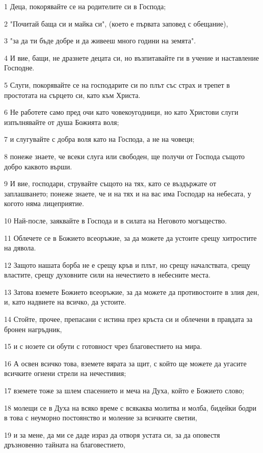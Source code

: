 \par 1 Деца, покорявайте се на родителите си в Господа;
\par 2 "Почитай баща си и майка си", (което е първата заповед с обещание),
\par 3 "за да ти бъде добре и да живееш много години на земята".
\par 4 И вие, бащи, не дразнете децата си, но възпитавайте ги в учение и наставление Господне.
\par 5 Слуги, покорявайте се на господарите си по плът със страх и трепет в простотата на сърцето си, като към Христа.
\par 6 Не работете само пред очи като човекоугодници, но като Христови слуги изпълнявайте от душа Божията воля;
\par 7 и слугувайте с добра воля като на Господа, а не на човеци;
\par 8 понеже знаете, че всеки слуга или свободен, ще получи от Господа същото добро каквото върши.
\par 9 И вие, господари, струвайте същото на тях, като се въздържате от заплашването; понеже знаете, че и на тях и на вас има Господар на небесата, у когото няма лицеприятие.
\par 10 Най-после, заяквайте в Господа и в силата на Неговото могъщество.
\par 11 Облечете се в Божието всеоръжие, за да можете да устоите срещу хитростите на дявола.
\par 12 Защото нашата борба не е срещу кръв и плът, но срещу началствата, срещу властите, срещу духовните сили на нечестието в небесните места.
\par 13 Затова вземете Божието всеоръжие, за да можете да противостоите в злия ден, и, като надвиете на всичко, да устоите.
\par 14 Стойте, прочее, препасани с истина през кръста си и облечени в правдата за бронен нагръдник,
\par 15 и с нозете си обути с готовност чрез благовестието на мира.
\par 16 А освен всичко това, вземете вярата за щит, с който ще можете да угасите всичките огнени стрели на нечестивия;
\par 17 вземете тоже за шлем спасението и меча на Духа, който е Божието слово;
\par 18 молещи се в Духа на всяко време с всякаква молитва и молба, бидейки бодри в това с неуморно постоянство и моление за всичките светии,
\par 19 и за мене, да ми се даде израз да отворя устата си, за да оповестя дръзновенно тайната на благовестието,
